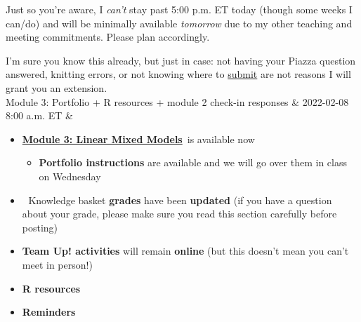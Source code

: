 \documentclass[
  openany]{book}
\providecommand{\tightlist}{%
  \setlength{\itemsep}{0pt}\setlength{\parskip}{0pt}}
\begin{document}
\begin{longtable}[]
Just so you're aware, I \emph{can't} stay past 5:00 p.m. ET today (though some weeks I can/do) and will be minimally available \emph{tomorrow} due to my other teaching and meeting commitments. Please plan accordingly.


I'm sure you know this already, but just in case: not having your Piazza question answered, knitting errors, or not knowing where to \href{https://markus-ds.teach.cs.toronto.edu/courses}{submit} are not reasons I will grant you an extension.~ \\
Module 3: Portfolio + R resources + module 2 check-in responses & 2022-02-08 8:00 a.m. ET & \begin{minipage}[t]{\linewidth}\raggedright
\begin{itemize}
\item
  \href{https://sta303-bolton.github.io/sta303-w22-courseguide/m3.html\#statdew-valley-interactive}{\textbf{Module 3: Linear Mixed Models}}~is available now

  \begin{itemize}
  \tightlist
  \item
    \textbf{Portfolio instructions} are available and we will go over them in class on Wednesday
  \end{itemize}
\item
  🧺 Knowledge basket \textbf{grades} have been \textbf{updated} (if you have a question about your grade, please make sure you read this section carefully before posting)
\item
  \textbf{Team Up! activities} will remain \textbf{online} (but this doesn't mean you can't meet in person!)
\item
  \textbf{R resources}
\item
  \textbf{Reminders}~


\end{itemize}
\end{minipage}
\end{longtable}
\end{document}

